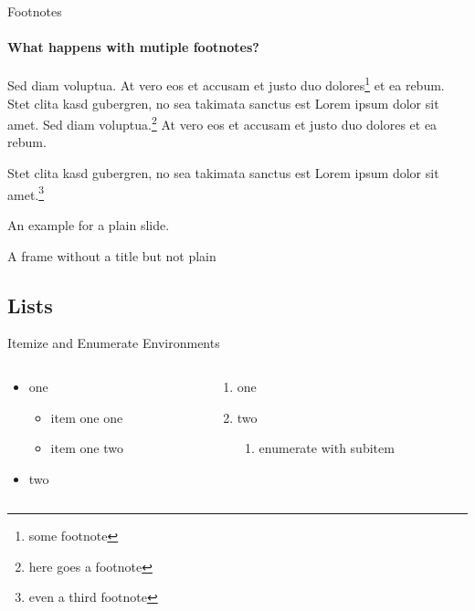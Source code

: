 \documentclass[]{beamer}
\begin{document}
\begin{frame}{Footnotes}
\framesubtitle{What happens with mutiple footnotes?}
	Sed diam voluptua. At vero eos et accusam et justo duo dolores\footnote{some footnote} et ea rebum. Stet clita kasd gubergren, no sea takimata sanctus est Lorem ipsum dolor sit amet. Sed diam voluptua.\footnote{here goes a footnote} At vero eos et accusam et justo duo dolores et ea rebum. 
	
	Stet clita kasd gubergren, no sea takimata sanctus est Lorem ipsum dolor sit amet.\footnote{even a third footnote}
\end{frame}

\begin{frame}[plain]
	An example for a plain slide.
\end{frame}

\begin{frame}
A frame without a title but not plain	
\end{frame}

\subsection{Lists}

\begin{frame}{Itemize and Enumerate Environments}
\begin{columns}
\begin{column}{0.5\textwidth}
   \begin{itemize}
		\item one \begin{itemize}
		\item item one one
		\item item one two
		\end{itemize}
		\item two
	\end{itemize}
\end{column}
\begin{column}{0.5\textwidth}  %
   \begin{enumerate}
\item one
\item two \begin{enumerate}
	\item enumerate with subitem
\end{enumerate}
\end{enumerate}
\end{column}
\end{columns}
\end{frame}
\end{document}
